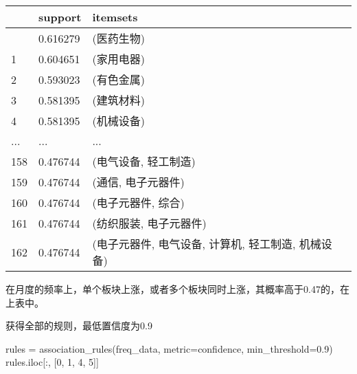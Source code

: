 \documentclass[
  letterpaper,
  DIV=11,
  numbers=noendperiod]{scrreprt}
\newenvironment{Shaded}{\begin{snugshade}}{\end{snugshade}}
\newcommand{\DecValTok}[1]{\textcolor[rgb]{0.68,0.00,0.00}{#1}}
\newcommand{\FloatTok}[1]{\textcolor[rgb]{0.68,0.00,0.00}{#1}}
\newcommand{\NormalTok}[1]{\textcolor[rgb]{0.00,0.23,0.31}{#1}}
\newcommand{\OperatorTok}[1]{\textcolor[rgb]{0.37,0.37,0.37}{#1}}
\newcommand{\StringTok}[1]{\textcolor[rgb]{0.13,0.47,0.30}{#1}}
\begin{document}
\begin{longtable}[]{@{}lll@{}}
\toprule\noalign{}
& support & itemsets \\
\midrule\noalign{}
\endhead
\bottomrule\noalign{}
\endlastfoot
0 & 0.616279 & (医药生物) \\
1 & 0.604651 & (家用电器) \\
2 & 0.593023 & (有色金属) \\
3 & 0.581395 & (建筑材料) \\
4 & 0.581395 & (机械设备) \\
... & ... & ... \\
158 & 0.476744 & (电气设备, 轻工制造) \\
159 & 0.476744 & (通信, 电子元器件) \\
160 & 0.476744 & (电子元器件, 综合) \\
161 & 0.476744 & (纺织服装, 电子元器件) \\
162 & 0.476744 & (电子元器件, 电气设备, 计算机, 轻工制造, 机械设备) \\
\end{longtable}

在月度的频率上，单个板块上涨，或者多个板块同时上涨，其概率高于0.47的，在上表中。

获得全部的规则，最低置信度为0.9

\begin{Shaded}
\begin{Highlighting}[]
\NormalTok{rules }\OperatorTok{=}\NormalTok{ association\_rules(freq\_data, metric}\OperatorTok{=}\StringTok{\textquotesingle{}confidence\textquotesingle{}}\NormalTok{, min\_threshold}\OperatorTok{=}\FloatTok{0.9}\NormalTok{)}
\NormalTok{rules.iloc[:, [}\DecValTok{0}\NormalTok{, }\DecValTok{1}\NormalTok{, }\DecValTok{4}\NormalTok{, }\DecValTok{5}\NormalTok{]]}
\end{Highlighting}
\end{Shaded}
\end{document}
